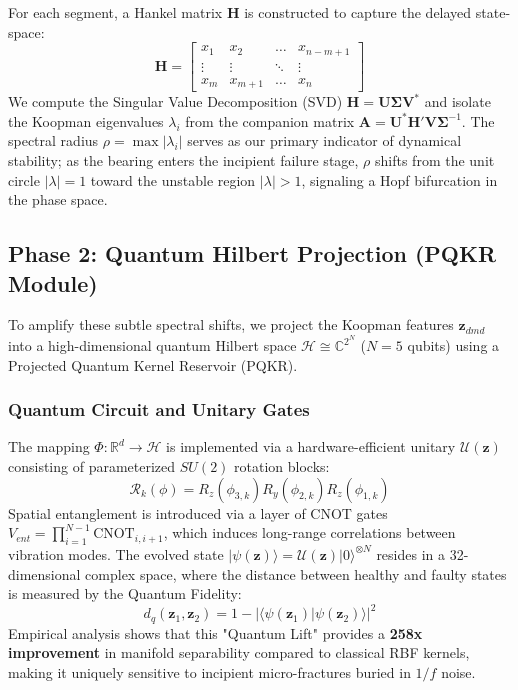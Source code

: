 \documentclass[a4paper,fleqn]{cas-dc}
\begin{document}
For each segment, a Hankel matrix $\mathbf{H}$ is constructed to capture the delayed state-space:
\begin{equation}
    \mathbf{H} = \begin{bmatrix} x_1 & x_2 & \dots & x_{n-m+1} \\ \vdots & \vdots & \ddots & \vdots \\ x_m & x_{m+1} & \dots & x_n \end{bmatrix}
\end{equation}
We compute the Singular Value Decomposition (SVD) $\mathbf{H} = \mathbf{U}\mathbf{\Sigma}\mathbf{V}^*$ and isolate the Koopman eigenvalues $\lambda_i$ from the companion matrix $\mathbf{A} = \mathbf{U}^*\mathbf{H}'\mathbf{V}\mathbf{\Sigma}^{-1}$. The spectral radius $\rho = \max |\lambda_i|$ serves as our primary indicator of dynamical stability; as the bearing enters the incipient failure stage, $\rho$ shifts from the unit circle $|\lambda|=1$ toward the unstable region $|\lambda|>1$, signaling a Hopf bifurcation in the phase space.

\subsection{Phase 2: Quantum Hilbert Projection (PQKR Module)}
\label{subsec:quantum}
To amplify these subtle spectral shifts, we project the Koopman features $\mathbf{z}_{dmd}$ into a high-dimensional quantum Hilbert space $\mathcal{H} \cong \mathbb{C}^{2^N}$ ($N=5$ qubits) using a Projected Quantum Kernel Reservoir (PQKR).

\subsubsection{Quantum Circuit and Unitary Gates}
The mapping $\Phi: \mathbb{R}^d \rightarrow \mathcal{H}$ is implemented via a hardware-efficient unitary $\mathcal{U}(\mathbf{z})$ consisting of parameterized $SU(2)$ rotation blocks:
\begin{equation}
    \mathcal{R}_k(\phi) = R_z(\phi_{3,k}) R_y(\phi_{2,k}) R_z(\phi_{1,k})
\end{equation}
Spatial entanglement is introduced via a layer of CNOT gates $V_{ent} = \prod_{i=1}^{N-1} \text{CNOT}_{i,i+1}$, which induces long-range correlations between vibration modes. The evolved state $|\psi(\mathbf{z})\rangle = \mathcal{U}(\mathbf{z})|0\rangle^{\otimes N}$ resides in a 32-dimensional complex space, where the distance between healthy and faulty states is measured by the Quantum Fidelity:
\begin{equation}
    d_q(\mathbf{z}_1, \mathbf{z}_2) = 1 - |\langle \psi(\mathbf{z}_1) | \psi(\mathbf{z}_2) \rangle|^2
\end{equation}
Empirical analysis shows that this "Quantum Lift" provides a \textbf{258x improvement} in manifold separability compared to classical RBF kernels, making it uniquely sensitive to incipient micro-fractures buried in $1/f$ noise.
\end{document}
